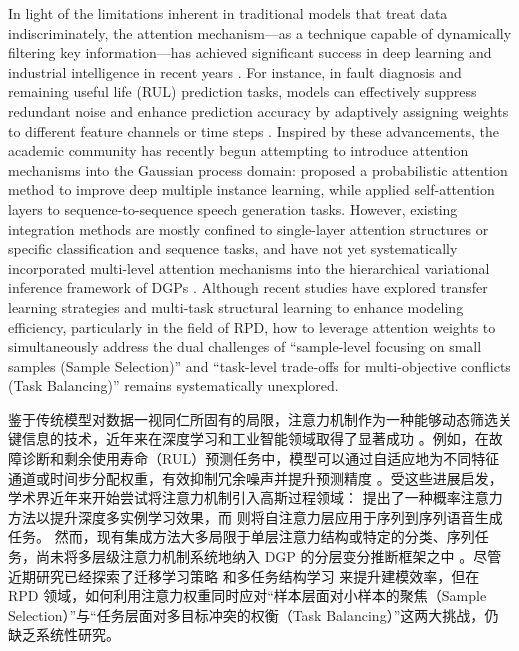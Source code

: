 \documentclass[11pt]{article}
\begin{document}
In light of the limitations inherent in traditional models that treat data indiscriminately, the attention mechanism—as a technique capable of dynamically filtering key information—has achieved significant success in deep learning and industrial intelligence in recent years \citep{Cho2024, Guo2025}. For instance, in fault diagnosis and remaining useful life (RUL) prediction tasks, models can effectively suppress redundant noise and enhance prediction accuracy by adaptively assigning weights to different feature channels or time steps \citep{Fan2025, Ma2025}. Inspired by these advancements, the academic community has recently begun attempting to introduce attention mechanisms into the Gaussian process domain: \cite{Schmidt2024} proposed a probabilistic attention method to improve deep multiple instance learning, while \cite{Nakamura2021} applied self-attention layers to sequence-to-sequence speech generation tasks. 
However, existing integration methods are mostly confined to single-layer attention structures or specific classification and sequence tasks, and have not yet systematically incorporated multi-level attention mechanisms into the hierarchical variational inference framework of DGPs \citep{Booth2025}.  Although recent studies have explored transfer learning strategies \citep{Yao2026} and multi-task structural learning \citep{Yang2025} to enhance modeling efficiency,  particularly in the field of RPD, how to leverage attention weights to simultaneously address the dual challenges of ``sample-level focusing on small samples (Sample Selection)'' and ``task-level trade-offs for multi-objective conflicts (Task Balancing)'' remains systematically unexplored.

鉴于传统模型对数据一视同仁所固有的局限，注意力机制作为一种能够动态筛选关键信息的技术，近年来在深度学习和工业智能领域取得了显著成功 \citep{Cho2024, Guo2025}。例如，在故障诊断和剩余使用寿命（RUL）预测任务中，模型可以通过自适应地为不同特征通道或时间步分配权重，有效抑制冗余噪声并提升预测精度 \citep{Fan2025, Ma2025}。受这些进展启发，学术界近年来开始尝试将注意力机制引入高斯过程领域：\cite{Schmidt2024} 提出了一种概率注意力方法以提升深度多实例学习效果，而 \cite{Nakamura2021} 则将自注意力层应用于序列到序列语音生成任务。
然而，现有集成方法大多局限于单层注意力结构或特定的分类、序列任务，尚未将多层级注意力机制系统地纳入 DGP 的分层变分推断框架之中 \citep{Booth2025}。尽管近期研究已经探索了迁移学习策略 \citep{Yao2026} 和多任务结构学习 \citep{Yang2025} 来提升建模效率，但在 RPD 领域，如何利用注意力权重同时应对“样本层面对小样本的聚焦（Sample Selection）”与“任务层面对多目标冲突的权衡（Task Balancing）”这两大挑战，仍缺乏系统性研究。
\end{document}
